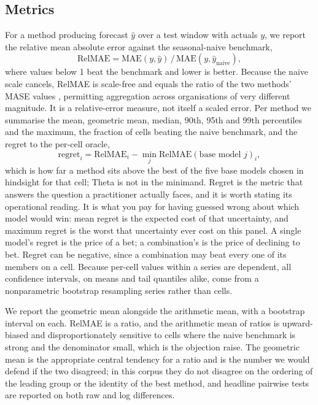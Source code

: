 \documentclass[11pt]{article}
\begin{document}
\subsection{Metrics}
\label{sec:metrics}

For a method producing forecast $\hat{y}$ over a test window with actuals $y$, we report the relative mean absolute error against the seasonal-naive benchmark,
\[
\mathrm{RelMAE} = \mathrm{MAE}(y, \hat{y}) \,/\, \mathrm{MAE}(y, \hat{y}_{\text{naive}}),
\]
where values below 1 beat the benchmark and lower is better. Because the naive scale cancels, RelMAE is scale-free and equals the ratio of the two methods' MASE values \citep{hyndman2006}, permitting aggregation across organisations of very different magnitude. It is a relative-error measure, not itself a scaled error. Per method we summarise the mean, geometric mean, median, 90th, 95th and 99th percentiles and the maximum, the fraction of cells beating the naive benchmark, and the regret to the per-cell oracle,
\[
\mathrm{regret}_i = \mathrm{RelMAE}_i - \min_j \mathrm{RelMAE}(\text{base model } j)_i ,
\]
which is how far a method sits above the best of the five base models chosen in hindsight for that cell; Theta is not in the minimand. Regret is the metric that answers the question a practitioner actually faces, and it is worth stating its operational reading. It is what you pay for having guessed wrong about which model would win: mean regret is the expected cost of that uncertainty, and maximum regret is the worst that uncertainty ever cost on this panel. A single model's regret is the price of a bet; a combination's is the price of declining to bet. Regret can be negative, since a combination may beat every one of its members on a cell. Because per-cell values within a series are dependent, all confidence intervals, on means and tail quantiles alike, come from a nonparametric bootstrap resampling series rather than cells.

We report the geometric mean alongside the arithmetic mean, with a bootstrap interval on each. RelMAE is a ratio, and the arithmetic mean of ratios is upward-biased and disproportionately sensitive to cells where the naive benchmark is strong and the denominator small, which is the objection \citet{hyndman2006} raise. The geometric mean is the appropriate central tendency for a ratio and is the number we would defend if the two disagreed; in this corpus they do not disagree on the ordering of the leading group or the identity of the best method, and headline pairwise tests are reported on both raw and log differences.
\end{document}

